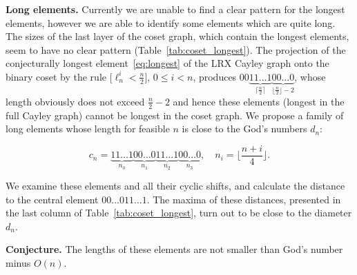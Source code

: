 \documentclass[reqno,11pt]{amsart}
\begin{document}
{\bf Long elements.} Currently we are unable to find a clear pattern for the longest elements, 
however we are able to identify some elements which are quite long.
The sizes of the last layer of the coset graph, which contain the longest elements, seem to have no clear pattern (Table~\ref{tab:coset_longest}). The projection of the conjecturally longest element~\eqref{eq:longest} of the LRX Cayley graph onto the binary coset by the rule $ \big[\ell_n^i < \frac n2\big]$, $0 \leq i <n$, produces
$00\underbrace{11\ldots 1}_{\lceil \frac n2 \rceil}\underbrace{00\ldots 0}_{\lfloor \frac n2 \rfloor - 2}
$,
whose length obviously does not exceed $\frac n2 - 2$ and hence these elements (longest in the full Cayley graph) cannot be longest in the coset graph. We propose a family of long elements whose length for feasible $n$ is close to the God's numbers $d_n$:

\begin{equation}
    c_n = \underbrace{11\ldots 1}_{n_0}\underbrace{00\ldots 0}_{n_1} \underbrace{11\ldots 1}_{n_2}\underbrace{00\ldots 0}_{n_3}, \quad n_i = \Big\lfloor \frac{n+i}4\Big\rfloor.
\end{equation}

We examine these elements and all their cyclic shifts, and calculate the distance to the central element $00\ldots 011\ldots 1$. The maxima of these distances, presented in the last column of Table~\ref{tab:coset_longest}, turn out to be close to the diameter $d_n$.

{\bf Conjecture.} The lengths of these elements are not smaller than God's number minus $O(n)$.  
\end{document}
